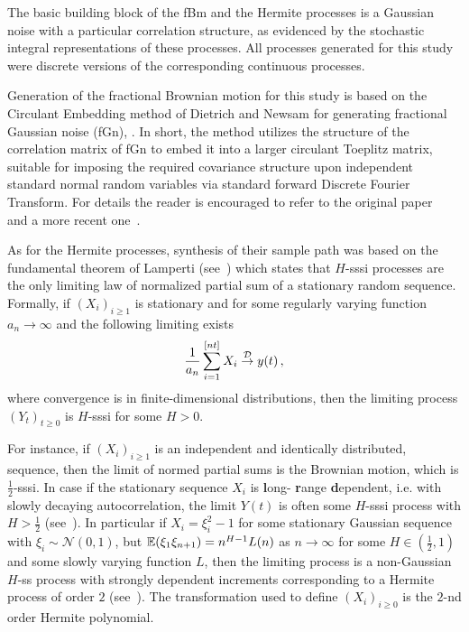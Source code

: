 The basic building block of the fBm and the Hermite processes is a Gaussian noise with a
particular correlation structure, as evidenced by the stochastic integral representations
of these processes. All processes generated for this study were discrete versions of
the corresponding continuous processes.

Generation of the fractional Brownian motion for this study is based on the Circulant
Embedding method of Dietrich and Newsam for generating fractional Gaussian noise (fGn),
\cite{WRCR:WRCR6232}. In short, the method utilizes the structure of the correlation
matrix of fGn to embed it into a larger circulant Toeplitz matrix, suitable for
imposing the required covariance structure upon independent standard normal random
variables via standard forward Discrete Fourier Transform. For details the reader
is encouraged to refer to the original paper~\cite{WRCR:WRCR6232} and a more recent
one~\cite{Perrin:1058211}.

As for the Hermite processes, synthesis of their sample path was based on the fundamental
theorem of Lamperti (see~\cite{embrechtsselfsimilar}) which states that $H$-sssi
processes are the only limiting law of normalized partial sum of a stationary random
sequence. Formally, if $(X_i)_{i\geq1}$ is stationary and for some regularly varying
function $a_n\to \infty$ and the following limiting exists
\[ \frac{1}{a_n} \sum_{i=1}^{[nt]} X_i \overset{\mathcal{D}}{\rightarrow} y(t) \,, \]
where convergence is in finite-dimensional distributions, then the limiting process
$(Y_t)_{t\geq0}$ is $H$-sssi for some $H>0$.

For instance, if $(X_i)_{i\geq 1}$ is an independent and identically distributed,
sequence, then the limit of normed partial sums is the Brownian motion, which is
$\frac{1}{2}$-sssi. In case if the stationary sequence $X_i$ is \textbf{l}ong-
\textbf{r}ange \textbf{d}ependent, i.e. with slowly decaying autocorrelation,
the limit $Y(t)$ is often some $H$-sssi process with $H>\frac{1}{2}$ (see~\cite{embrechtsselfsimilar}).
In particular if $X_i = \xi_i^2 -1$ for some stationary Gaussian sequence with
$\xi_i\sim\mathcal{N}(0,1)$, but $\mathbb{E}(\xi_1\xi_{n+1}) = n^{H-1}L(n)$ as $n\to \infty$
for some $H\in(\tfrac{1}{2},1)$ and some slowly varying function $L$, then the
limiting process is a non-Gaussian $H$-ss process with strongly dependent increments
corresponding to a Hermite process of order $2$ (see~\cite{embrechts2000introduction}).
The transformation used to define $(X_i)_{i\geq0}$ is the $2$-nd order Hermite
polynomial.

